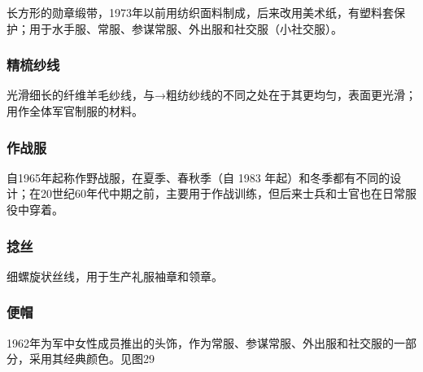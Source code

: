 长方形的勋章缎带，1973年以前用纺织面料制成，后来改用美术纸，有塑料套保护；用于水手服、常服、参谋常服、外出服和社交服（小社交服）。

\subsubsection*{精梳纱线}%

光滑细长的纤维羊毛纱线，与→粗纺纱线的不同之处在于其更均匀，表面更光滑；用作全体军官制服的材料。

\subsubsection*{作战服}%

自1965年起称作野战服，在夏季、春秋季（自 1983 年起）和冬季都有不同的设计；在20世纪60年代中期之前，主要用于作战训练，但后来士兵和士官也在日常服役中穿着。

\subsubsection*{捻丝}%

细螺旋状丝线，用于生产礼服袖章和领章。

\subsubsection*{便帽}%

1962年为军中女性成员推出的头饰，作为常服、参谋常服、外出服和社交服的一部分，采用其经典颜色。见图29

